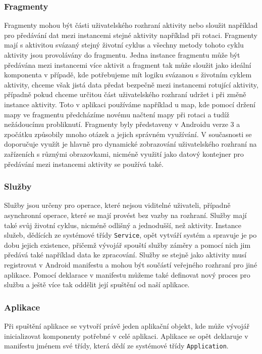 \documentclass[czech,master,public,dept460,male,java,cpdeclaration]{diploma}
\begin{document}
\subsubsection{Fragmenty}
Fragmenty mohou být části uživatelského rozhraní aktivity nebo sloužit například pro předávání
dat mezi instancemi stejné aktivity například při rotaci. Fragmenty mají s aktivitou svázaný stejný životní cyklus
a všechny metody tohoto cyklu aktivity jsou provolávány do fragmentu. Jedna instance fragmentu
může být předávána mezi instancemi více aktivit a fragment tak může sloužit jako ideální komponenta
v případě, kde potřebujeme mít logiku svázanou s životním cyklem aktivity, chceme však jistá data
předat bezpečně mezi instancemi rotující aktivity, případně pokud chceme určitou část uživatelského
rozhraní udržet i při změně instance aktivity. Toto v aplikaci používáme například u map, kde pomocí
držení mapy ve fragmentu předcházíme novému načtení mapy při rotaci a tudíž nežádoucímu probliknutí.
Fragmenty byly představeny v Androidu verze 3 a zpočátku způsobily mnoho otázek a jejich správném využívání.
V současnosti se doporučuje využít je hlavně pro dynamické zobrazování uživatelského rozhraní na
zařízeních s různými obrazovkami\cite{androiddevelopers}, nicméně využití jako datový kontejner pro
předávání mezi instancemi aktivity se používá také.

\subsubsection{Služby}
Služby jsou určeny pro operace, které nejsou viditelné uživateli, případně asynchronní operace, které se mají
provést bez vazby na rozhraní. Služby mají také svůj životní cyklus, nicméně odlišný a jednodušší,
než aktivity. Instance služeb, dědících ze systémové třídy \texttt{Service}, opět vytváří
systém a spravuje je po dobu jejich existence,
přičemž vývojář spouští služby záměry a pomocí nich jim předává také například data ke zpracování.
Služby se stejně jako aktivity musí registrovat v Android manifestu a mohou být součástí veřejného
rozhraní pro jiné aplikace. Pomocí deklarace v manifestu můžeme také definovat nový proces pro službu
a ještě více tak oddělit její spuštění od naší aplikace.

\subsubsection{Aplikace}
Při spuštění aplikace se vytvoří právě jeden aplikační objekt, kde může vývojář inicializovat
komponenty potřebné v celé aplikaci. Aplikace se opět deklaruje v manifestu jménem své třídy, která
dědí ze systémové třídy \texttt{Application}.
\end{document}
